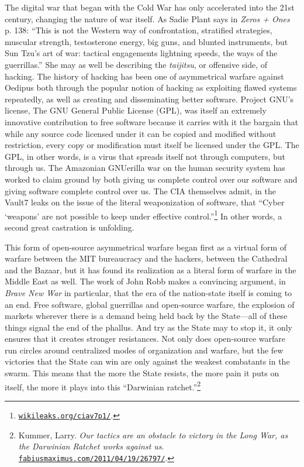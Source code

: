 \documentclass[10pt, statementpaper, twoside, openright]{memoir}
\begin{document}
The digital war that began with the Cold War has only accelerated into the 21st century, changing the nature of war itself. As Sadie Plant says in \textit{Zeros + Ones} p. 138: ``This is not the Western way of confrontation, stratified strategies, muscular strength, testosterone energy, big guns, and blunted instruments, but Sun Tzu's art of war: tactical engagements lightning speeds, the ways of the guerrillas.'' She may as well be describing the \textit{taijitsu}, or offensive side, of hacking. The history of hacking has been one of asymmetrical warfare against Oedipus both through the popular notion of hacking as exploiting flawed systems repeatedly, as well as creating and disseminating better software. Project GNU's license, The GNU General Public License (GPL), was itself an extremely innovative contribution to free software because it carries with it the bargain that while any source code licensed under it can be copied and modified without restriction, every copy or modification must itself be licensed under the GPL. The GPL, in other words, is a virus that spreads itself not through computers, but through us. The Amazonian GNUerilla war on the human security system has worked to claim ground by both giving us complete control over our software and giving software complete control over us. The CIA themselves admit, in the Vault7 leaks on the issue of the literal weaponization of software, that ``Cyber `weapons' are not possible to keep under effective control.''\footnote{\href{https://wikileaks.org/ciav7p1/}{\nolinkurl{wikileaks.org/ciav7p1/}}.} In other words, a second great castration is unfolding.

This form of open-source asymmetrical warfare began first as a virtual form of warfare between the MIT bureaucracy and the hackers, between the Cathedral and the Bazaar, but it has found its realization as a literal form of warfare in the Middle East as well. The work of John Robb makes a convincing argument, in \textit{Brave New War} in particular, that the era of the nation-state itself is coming to an end. Free software, global guerrillas and open-source warfare, the explosion of markets wherever there is a demand being held back by the State---all of these things signal the end of the phallus. And try as the State may to stop it, it only ensures that it creates stronger resistances. Not only does open-source warfare run circles around centralized modes of organization and warfare, but the few victories that the State can win are only against the weakest combatants in the swarm. This means that the more the State resists, the more pain it puts on itself, the more it plays into this ``Darwinian ratchet.''\footnote{Kummer, Larry. \textit{Our tactics are an obstacle to victory in the Long War, as the Darwinian Ratchet works against us}. \href{https://fabiusmaximus.com/2011/04/19/26797/}{\nolinkurl{fabiusmaximus.com/2011/04/19/26797/}}.}
\end{document}
